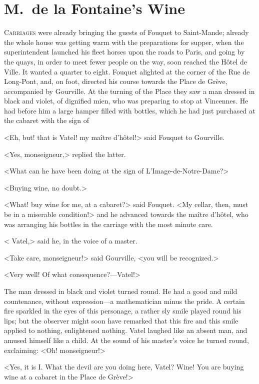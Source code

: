 \chapter{M.~de la Fontaine's Wine}
	
\lettrine{C}{arriages} were already bringing the guests of Fouquet to Saint-Mande; already the whole house was getting warm with the preparations for supper, when the superintendent launched his fleet horses upon the roads to Paris, and going by the quays, in order to meet fewer people on the way, soon reached the Hôtel de Ville. It wanted a quarter to eight. Fouquet alighted at the corner of the Rue de Long-Pont, and, on foot, directed his course towards the Place de Grève, accompanied by Gourville. At the turning of the Place they saw a man dressed in black and violet, of dignified mien, who was preparing to stop at Vincennes. He had before him a large hamper filled with bottles, which he had just purchased at the cabaret with the sign of 

<Eh, but! that is Vatel! my maître d'hôtel!> said Fouquet to Gourville.

<Yes, monseigneur,> replied the latter.

<What can he have been doing at the sign of L'Image-de-Notre-Dame?>

<Buying wine, no doubt.>

<What! buy wine for me, at a cabaret?> said Fouquet. <My cellar, then, must be in a miserable condition!> and he advanced towards the maître d'hôtel, who was arranging his bottles in the carriage with the most minute care.

< Vatel,> said he, in the voice of a master.

<Take care, monseigneur!> said Gourville, <you will be recognized.>

<Very well! Of what consequence?—Vatel!>

The man dressed in black and violet turned round. He had a good and mild countenance, without expression—a mathematician minus the pride. A certain fire sparkled in the eyes of this personage, a rather sly smile played round his lips; but the observer might soon have remarked that this fire and this smile applied to nothing, enlightened nothing. Vatel laughed like an absent man, and amused himself like a child. At the sound of his master's voice he turned round, exclaiming: <Oh! monseigneur!>

<Yes, it is I\@. What the devil are you doing here, Vatel? Wine! You are buying wine at a cabaret in the Place de Grève!>


